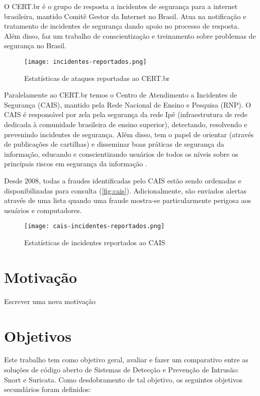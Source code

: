 O CERT.br é o grupo de resposta a incidentes de segurança para a internet brasileira, mantido Comitê Gestor da Internet no Brasil. Atua na notificação e tratamento de incidentes de segurança dando apoio no processo de resposta. Além disso, faz um trabalho de conscientização e treinamento sobre problemas de segurança no Brasil. 

\begin{figure}[!htb]
 \centering
 \caption{Estatísticas de ataques reportadas ao CERT.br}
 \texttt{[image: incidentes-reportados.png]}
 \label{fig:cert}
\end{figure}

Paralelamente ao CERT.br temos o Centro de Atendimento a Incidentes de Segurança (CAIS), mantido pela Rede Nacional de Ensino e Pesquisa (RNP). O CAIS é responsável por zela pela segurança da rede Ipê (infraestrutura de rede dedicada à comunidade brasileira de ensino superior), detectando, resolvendo e prevenindo incidentes de segurança. Além disso, tem o papel de orientar (através de publicações de cartilhas) e disseminar boas práticas de segurança da informação, educando e conscientizando usuários de todos os níveis sobre os principais riscos em segurança da informação \cite{cais}.

Desde 2008, todas a fraudes identificadas pelo CAIS estão sendo ordenadas e disponibilizadas para consulta (\autoref{fig:cais}). Adicionalmente, são enviados alertas através de uma lista quando uma fraude mostra-se particularmente perigosa aos usuários e computadores.

\begin{figure}[!htb]
 \centering
 \caption{Estatísticas de incidentes reportados ao CAIS}
 \texttt{[image: cais-incidentes-reportados.png]}
 \label{fig:cais}
\end{figure}

\section{Motivação} \label{sec:motivação} 

Escrever uma nova motivação

\section{Objetivos} \label{sec:objetivos}

Este trabalho tem como objetivo geral, avaliar e fazer um comparativo entre as soluções de código aberto de Sistemas de Detecção e Prevenção de Intrusão: Snort e Suricata. Como desdobramento de tal objetivo, os seguintes objetivos secundários foram definidos:

